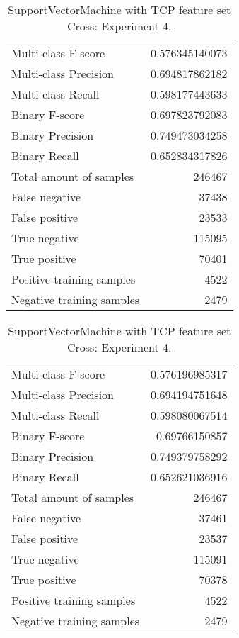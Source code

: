 \begin{table}[H]
\begin{minipage}{0.5\textwidth}
\caption{SupportVectorMachine with TCP feature set Cross: Experiment 3.}
\centering
\begin{tabular}{l r}
\toprule
Multi-class F-score & 0.576345140073 \\
Multi-class Precision & 0.694817862182 \\
Multi-class Recall & 0.598177443633 \\
\midrule
Binary F-score & 0.697823792083 \\
Binary Precision & 0.749473034258 \\
Binary Recall & 0.652834317826 \\
\midrule
Total amount of samples & 246467 \\
False negative & 37438 \\
False positive & 23533 \\
True negative & 115095 \\
True positive & 70401 \\
\midrule
Positive training samples & 4522 \\
Negative training samples & 2479 \\
\bottomrule
\end{tabular}
\end{minipage}
\hfillx
\begin{minipage}{0.5\textwidth}
\caption{SupportVectorMachine with TCP feature set Cross: Experiment 4.}
\centering
\begin{tabular}{l r}
\toprule
Multi-class F-score & 0.576196985317 \\
Multi-class Precision & 0.694194751648 \\
Multi-class Recall & 0.598080067514 \\
\midrule
Binary F-score & 0.69766150857 \\
Binary Precision & 0.749379758292 \\
Binary Recall & 0.652621036916 \\
\midrule
Total amount of samples & 246467 \\
False negative & 37461 \\
False positive & 23537 \\
True negative & 115091 \\
True positive & 70378 \\
\midrule
Positive training samples & 4522 \\
Negative training samples & 2479 \\
\bottomrule
\end{tabular}
\end{minipage}
\end{table}

